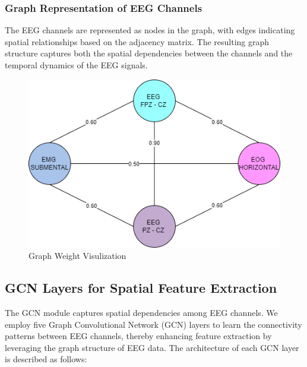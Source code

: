 \subsubsection{Graph Representation of EEG Channels}
The EEG channels are represented as nodes in the graph, with edges indicating spatial relationships based on the adjacency matrix. The resulting graph structure captures both the spatial dependencies between the channels and the temporal dynamics of the EEG signals.
\begin{figure}[!h]
    \centering
    \includegraphics[width=0.5\linewidth]{img/Graph Weightage.png}
    \caption{Graph Weight Visulization}
    \label{fig:enter-label}
\end{figure}






\subsection{GCN Layers for Spatial Feature Extraction}

The GCN module captures spatial dependencies among EEG channels. We employ five Graph Convolutional Network (GCN) layers to learn the connectivity patterns between EEG channels, thereby enhancing feature extraction by leveraging the graph structure of EEG data. The architecture of each GCN layer is described as follows:

